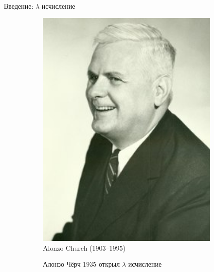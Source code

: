 

\newcommand{\tb}[1]{\textcolor{blue}{#1}}
\newcommand{\tr}[1]{\textcolor{red}{#1}}

\begin{frame}{Введение: $\lambda$-исчисление}
  \begin{figure}
    \centering
    \begin{subfigure}[t]{0.45\textwidth}
      \begin{minipage}{0.7\textwidth}
      \includegraphics[width=1\textwidth]{220px-Alonzo_Church.jpg}\\
            Alonzo Church (1903--1995)
      \end{minipage}
    \end{subfigure}
    \begin{subfigure}[t]{0.45\textwidth}
      \vspace{-5em}   %
  Алонзо Чёрч 1935   открыл $\lambda$-исчисление
\vspace{1em}


\end{subfigure}
\end{figure}
\end{frame}
